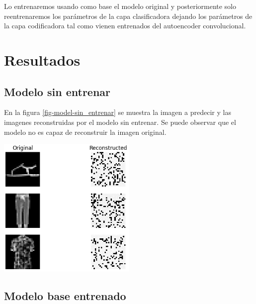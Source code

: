 \documentclass[aps,prl,reprint,groupedaddress]{revtex4-2}
\newenvironment{Figura}
  {\par\medskip\noindent\minipage{\linewidth}}
  {\endminipage\par\medskip}
\begin{document}
Lo entrenaremos usando como base el modelo original y posteriormente solo 
reentrenaremos los parámetros de la capa clasificadora dejando los parámetros
de la capa codificadora tal como vienen entrenados del autoencoder convolucional.

\section{Resultados}
\subsection{Modelo sin entrenar}

En la figura \ref{fig-model-sin_entrenar} se muestra la imagen a predecir y las
imagenes reconstruidas por el modelo sin entrenar. Se puede observar que el
modelo no es capaz de reconstruir la imagen original.

\begin{Figura}
  \centering
  \includegraphics[width=0.5\textwidth]{figs/modelo_sin_entrenar.png}
  \label{fig-model-sin-entrenar}
\end{Figura}

\subsection{Modelo base entrenado}
\end{document}

